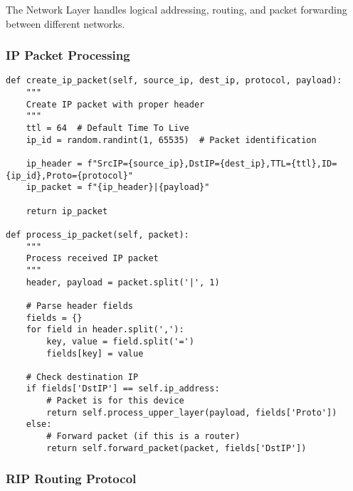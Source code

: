 \documentclass[12pt,a4paper]{article}
\begin{document}
The Network Layer handles logical addressing, routing, and packet forwarding between different networks.

\subsubsection{IP Packet Processing}

\begin{lstlisting}[caption=IP Packet Creation and Processing]
def create_ip_packet(self, source_ip, dest_ip, protocol, payload):
    """
    Create IP packet with proper header
    """
    ttl = 64  # Default Time To Live
    ip_id = random.randint(1, 65535)  # Packet identification
    
    ip_header = f"SrcIP={source_ip},DstIP={dest_ip},TTL={ttl},ID={ip_id},Proto={protocol}"
    ip_packet = f"{ip_header}|{payload}"
    
    return ip_packet

def process_ip_packet(self, packet):
    """
    Process received IP packet
    """
    header, payload = packet.split('|', 1)
    
    # Parse header fields
    fields = {}
    for field in header.split(','):
        key, value = field.split('=')
        fields[key] = value
    
    # Check destination IP
    if fields['DstIP'] == self.ip_address:
        # Packet is for this device
        return self.process_upper_layer(payload, fields['Proto'])
    else:
        # Forward packet (if this is a router)
        return self.forward_packet(packet, fields['DstIP'])
\end{lstlisting}

\subsubsection{RIP Routing Protocol}
\end{document}
